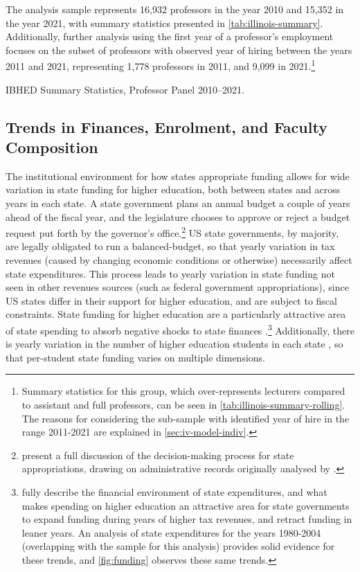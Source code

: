 The analysis sample represents 16,932 professors in the year 2010 and 15,352 in the year 2021, with summary statistics presented in \autoref{tab:illinois-summary}.
Additionally, further analysis using the first year of a professor's employment focuses on the subset of professors with observed year of hiring between the years 2011 and 2021, representing 1,778 professors in 2011, and 9,099 in 2021.\footnote{
    Summary statistics for this group, which over-represents lecturers compared to assistant and full professors, can be seen in \autoref{tab:illinois-summary-rolling}.
    The reasons for considering the sub-sample with identified year of hire in the range 2011-2021 are explained in \autoref{sec:iv-model-indiv}.
}

\begin{table}[h!]
    \singlespacing
    \centering
    \caption{IBHED Summary Statistics, Professor Panel 2010--2021.}
    \makebox[\textwidth][c]{}
    \label{tab:illinois-summary}
\end{table}

\subsection{Trends in Finances, Enrolment, and Faculty Composition}
\label{sec:trends}

The institutional environment for how states appropriate funding allows for wide variation in state funding for higher education, both between states and across years in each state.
A state government plans an annual budget a couple of years ahead of the fiscal year, and the legislature chooses to approve or reject a budget request put forth by the governor's office.\footnote{
    \cite{NBERw23736} present a full discussion of the decision-making process for state appropriations, drawing on administrative records originally analysed by \cite{parmley2009state}.
}
US state governments, by majority, are legally obligated to run a balanced-budget, so that yearly variation in tax revenues (caused by changing economic conditions or otherwise) necessarily affect state expenditures.
This process leads to yearly variation in state funding not seen in other revenues sources (such as federal government appropriations), since US states differ in their support for higher education, and are subject to fiscal constraints.
State funding for higher education are a particularly attractive area of state spending to absorb negative shocks to state finances \citep{delaney2011state}.\footnote{
    \cite{delaney2011state} fully describe the financial environment of state expenditures, and what makes spending on higher education an attractive area for state governments to expand funding during years of higher tax revenues, and retract funding in leaner years.
    An analysis of state expenditures for the years 1980-2004 (overlapping with the sample for this analysis) provides solid evidence for these trends, and \autoref{fig:funding} observes these same trends.
}
Additionally, there is yearly variation in the number of higher education students in each state \citep{turner2014impact}, so that per-student state funding varies on multiple dimensions.

